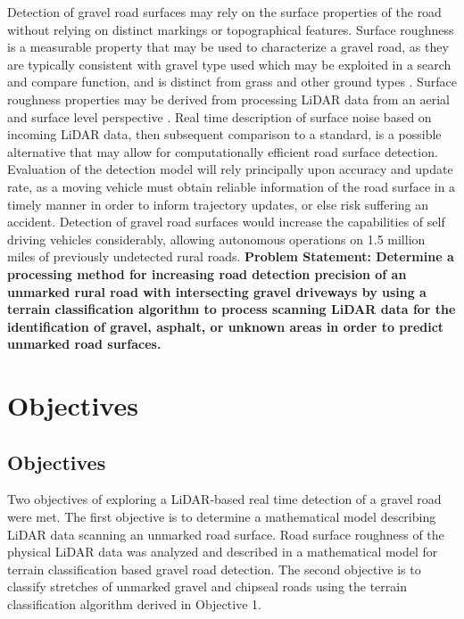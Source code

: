 \documentclass[numbered,pdftex]{ohio-etd}
\begin{document}
{	{Detection of gravel road surfaces may rely on the surface properties of the road without relying on distinct markings or topographical features. Surface roughness is a measurable property that may be used to characterize a gravel road, as they are typically consistent with gravel type used \cite{skorseth_gravel_nodate} which may be exploited in a search and compare function, and is distinct from grass and other ground types \cite{wan_road_2007, levi_3d_2012_light, levi_3d_2012_terrain}. Surface roughness properties may be derived from processing LiDAR data from an aerial and surface level perspective \cite{wan_road_2007, levi_3d_2012_light, levi_3d_2012_terrain, pollyea_experimental_2012,rychkov_computational_2012,lague_accurate_2013,brubaker_use_2013,turner_estimation_2014,campbell_lidar-based_2017,shepard_roughness_2001,tegowski_statistical_2016,sock_probabilistic_2016,milenkovic_roughness_2018,yadav_extraction_2017, yadav_rural_2018}. Real time description of surface noise based on incoming LiDAR data, then subsequent comparison to a standard, is a possible alternative that may allow for computationally efficient road surface detection. Evaluation of the detection model will rely principally upon accuracy and update rate, as a moving vehicle must obtain reliable information of the road surface in a timely manner in order to inform trajectory updates, or else risk suffering an accident. Detection of gravel road surfaces would increase the capabilities of self driving vehicles considerably, allowing autonomous operations on 1.5 million miles \cite{road_stats_2} of previously undetected rural roads. \textbf{Problem Statement: Determine a processing method for increasing road detection precision of an unmarked rural road with intersecting gravel driveways by using a terrain classification algorithm to process scanning LiDAR data for the identification of gravel, asphalt, or unknown areas in order to predict unmarked road surfaces.}
	
}

\chapter{Objectives}

\section{Objectives}

	{Two objectives of exploring a LiDAR-based real time detection of a gravel road were met. The first objective is to determine a mathematical model describing LiDAR data scanning an unmarked road surface. Road surface roughness of the physical LiDAR data was analyzed and described in a mathematical model for terrain classification based gravel road detection. The second objective is to classify stretches of unmarked gravel and chipseal roads using the terrain classification algorithm derived in Objective 1.}

}
\end{document}

